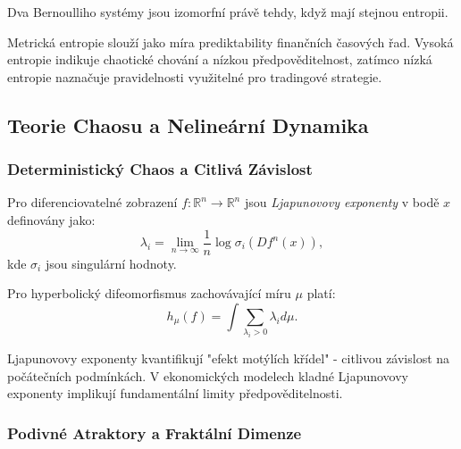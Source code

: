 \begin{theorem}
Dva Bernoulliho systémy jsou izomorfní právě tehdy, když mají stejnou entropii.
\end{theorem}

\begin{application}
Metrická entropie slouží jako míra prediktability finančních časových řad. Vysoká entropie indikuje chaotické chování a nízkou předpověditelnost, zatímco nízká entropie naznačuje pravidelnosti využitelné pro tradingové strategie.
\end{application}

\spc

\subsection{Teorie Chaosu a Nelineární Dynamika}

\subsubsection{Deterministický Chaos a Citlivá Závislost}

\begin{definition}
Pro diferenciovatelné zobrazení $f: \mathbb{R}^n \to \mathbb{R}^n$ jsou \emph{Ljapunovovy exponenty} v bodě $x$ definovány jako:
\[
\lambda_i = \lim_{n \to \infty} \frac{1}{n} \log \sigma_i(Df^n(x)),
\]
kde $\sigma_i$ jsou singulární hodnoty.
\end{definition}

\begin{theorem}
Pro hyperbolický difeomorfismus zachovávající míru $\mu$ platí:
\[
h_\mu(f) = \int \sum_{\lambda_i > 0} \lambda_i d\mu.
\]
\end{theorem}

\begin{application}
Ljapunovovy exponenty kvantifikují "efekt motýlích křídel" - citlivou závislost na počátečních podmínkách. V ekonomických modelech kladné Ljapunovovy exponenty implikují fundamentální limity předpověditelnosti.
\end{application}

\subsubsection{Podivné Atraktory a Fraktální Dimenze}

